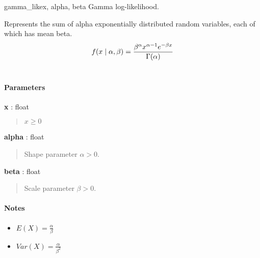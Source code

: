 \hypertarget{pymc.distributions.gamma_like}{}
\begin{funcdesc}{gamma\_like}{x, alpha, beta}
Gamma log-likelihood.

Represents the sum of alpha exponentially distributed random variables, each
of which has mean beta.
\begin{gather}
\begin{split}f(x \mid \alpha, \beta) = \frac{\beta^{\alpha}x^{\alpha-1}e^{-\beta x}}{\Gamma(\alpha)}\end{split}\notag\\\begin{split}\end{split}\notag
\end{gather}
\paragraph{Parameters}
\begin{paramlist}
\item[] \textbf{x} : float
\begin{quote}

$x \ge 0$
\end{quote}

\item[] \textbf{alpha} : float
\begin{quote}

Shape parameter $\alpha > 0$.
\end{quote}

\item[] \textbf{beta} : float
\begin{quote}

Scale parameter $\beta > 0$.
\end{quote}
\end{paramlist}
\paragraph{Notes}
\begin{itemize}
\item {} 
$E(X) = \frac{\alpha}{\beta}$

\item {} 
$Var(X) = \frac{\alpha}{\beta^2}$

\end{itemize}
\end{funcdesc}

